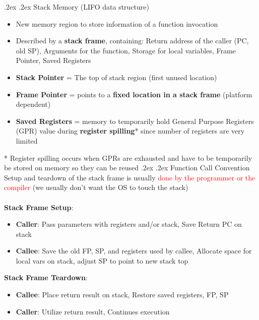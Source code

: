 \documentclass[13pt,landscape,a4paper]{article}
\makeatletter
\renewcommand{\subsection}{\@startsection{subsection}{1}{0mm}%
    {.2ex}%
    {.2ex}%
    {\sffamily\bfseries}}
\renewcommand{\subsubsection}{\@startsection{subsubsection}{1}{0mm}%
    {.2ex}%
    {.2ex}%
    {\rmfamily\bfseries}}
\makeatother
\begin{document}
\begin{multicols*}{3}
        \subsection{Stack Memory (LIFO data structure)}
        \begin{itemize}
            \item New memory region to store information of a function invocation
            \item Described by a \textbf{stack frame}, containing: Return address of the caller (PC, old SP), Arguments for the function, Storage for local variables, Frame Pointer, Saved Registers
            \item \textbf{Stack Pointer} = The top of stack region (first unused location)
            \item \textbf{Frame Pointer} = points to a \textbf{fixed location in a stack frame} (platform dependent)
            \item \textbf{Saved Registers} = memory to temporarily hold General Purpose Registers (GPR) value during \textbf{register spilling}* since number of registers are very limited
        \end{itemize}
        * Register spilling occurs when GPRs are exhausted and have to be temporarily be stored on memory so they can be reused
        \subsubsection{Function Call Convention}
        Setup and teardown of the stack frame is usually \textcolor{red}{done by the programmer or the compiler} (we usually don't want the OS to touch the stack)\\\\
        \textbf{Stack Frame Setup}:
        \begin{itemize}
            \item \textbf{Caller}: Pass parameters with registers and/or stack, Save Return PC on stack
            \item \textbf{Callee}: Save the old FP, SP, and registers used by callee, Allocate space for local vars on stack, adjust SP to point to new stack top\\
        \end{itemize}
        \textbf{Stack Frame Teardown}:
        \begin{itemize}
            \item \textbf{Callee}: Place return result on stack, Restore saved registers, FP, SP
            \item \textbf{Caller}: Utilize return result, Continues execution
        \end{itemize}

\end{multicols*}
\end{document}
